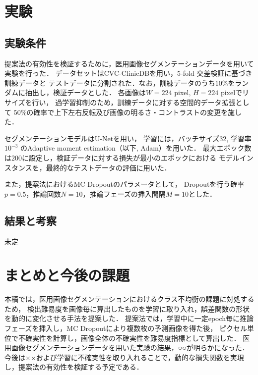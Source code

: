 \documentclass[10pt, a4paper, twocolumn]{jarticle}
\begin{document}
\newpage

\section{実験}
\subsection{実験条件}
提案法の有効性を検証するために，医用画像セグメンテーションデータを用いて実験を行った．
データセットはCVC-ClinicDB\cite{BERNAL201599}を用い，$5$-fold 交差検証に基づき訓練データと
テストデータに分割された．なお，訓練データのうち$10 \%$をランダムに抽出し，検証データとした．
各画像は$W = 224$ pixel, $H = 224$ pixelでリサイズを行い，
過学習抑制のため，訓練データに対する空間的データ拡張として
$50\%$の確率で上下左右反転及び画像の明るさ・コントラストの変更を施した．

セグメンテーションモデルはU-Net\cite{ronneberger2015u}を用い，
学習には，バッチサイズ$32$, 学習率$10 ^ {−3}$ のAdaptive moment
estimation（以下, Adam）\cite{kingma2014adam}を用いた．
最大エポック数は$200$に設定し，検証データに対する損失が最小のエポックにおける
モデルインスタンスを，最終的なテストデータの評価に用いた．

また，提案法におけるMC Dropoutのパラメータとして，
Dropoutを行う確率$p = 0.5$，推論回数$N = 10$，推論フェーズの挿入間隔$M = 10$とした．

\subsection{結果と考察}
未定

\section{まとめと今後の課題}
本稿では，医用画像セグメンテーションにおけるクラス不均衡の課題に対処するため，
検出難易度を画像毎に算出したものを学習に取り入れ，誤差関数の形状を動的に変化させる手法を提案した．
提案法では，学習中に一定epoch毎に推論フェーズを挿入し，MC Dropoutにより複数枚の予測画像を得た後，
ピクセル単位で不確実性を計算し，画像全体の不確実性を難易度指標として算出した．
医用画像セグメンテーションデータを用いた実験の結果，○○が明らかになった．
今後は××および学習に不確実性を取り入れることで，動的な損失関数を実現し，提案法の有効性を検証する予定である．


    
\end{document}
